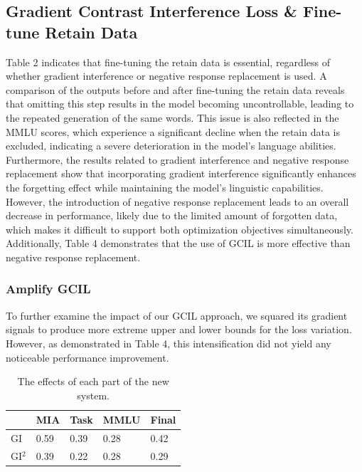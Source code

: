 \documentclass[11pt]{article}
\begin{document}
\subsection{Gradient Contrast Interference Loss \& Fine-tune Retain Data} 


Table 2 indicates that fine-tuning the retain data is essential, regardless of whether gradient interference or negative response replacement is used. A comparison of the outputs before and after fine-tuning the retain data reveals that omitting this step results in the model becoming uncontrollable, leading to the repeated generation of the same words. This issue is also reflected in the MMLU scores, which experience a significant decline when the retain data is excluded, indicating a severe deterioration in the model's language abilities. Furthermore, the results related to gradient interference and negative response replacement show that incorporating gradient interference significantly enhances the forgetting effect while maintaining the model's linguistic capabilities. However, the introduction of negative response replacement leads to an overall decrease in performance, likely due to the limited amount of forgotten data, which makes it difficult to support both optimization objectives simultaneously. Additionally, Table 4 demonstrates that the use of GCIL is more effective than negative response replacement.


\subsubsection{Amplify GCIL} 
To further examine the impact of our GCIL approach, we squared its gradient signals to produce more extreme upper and lower bounds for the loss variation. However, as demonstrated in Table 4, this intensification did not yield any noticeable performance improvement.

\begin{table}[h]\footnotesize
  \centering
    \begin{tabular}{l|l|l|l|l}
    \hline
        ~ & MIA & Task & MMLU & Final \\ \hline
        GI & 0.59 & 0.39 & 0.28 & 0.42 \\ \hline
        GI$^2$ & 0.39 & 0.22 & 0.28 & 0.29 \\ \hline
    \end{tabular}
  \caption{The effects of each part of the new system.}
  \label{tab:accents}
\end{table}
\end{document}
